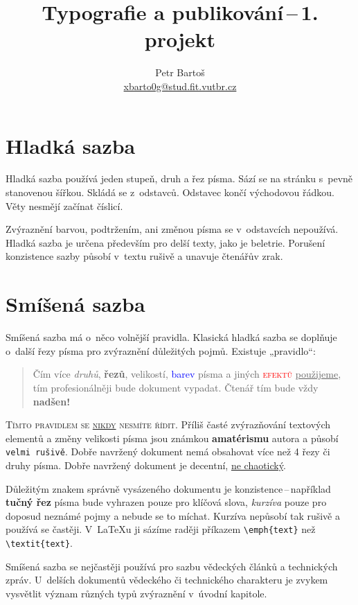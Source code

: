 \documentclass[twocolumn, 10pt, a4paper]{article}
\title{Typografie a publikování\,--\,1. projekt}
\author{Petr Bartoš \\ \href{mailto:xbarto0g@stud.fit.vutbr.cz}{xbarto0g@stud.fit.vutbr.cz}}
\date{}
\begin{document}
\maketitle

\section{Hladká sazba}
Hladká sazba používá jeden stupeň, druh a řez písma.
Sází se na stránku s~pevně stanovenou šířkou.
Skládá se z~odstavců. Odstavec končí východovou řádkou.
Věty nesmějí začínat číslicí.

Zvýraznění barvou, podtržením, ani změnou písma se v~odstavcích nepoužívá.
Hladká sazba je určena především pro delší texty, jako je beletrie.
Porušení konzistence sazby působí v~textu rušivě a unavuje čtenářův zrak.

\section{Smíšená sazba}
\label{section:druha_sekce}
Smíšená sazba má o~něco volnější pravidla.
Klasická hladká sazba se doplňuje o~další řezy písma pro zvýraznění důležitých pojmů.
Existuje „pravidlo“:
\begin{quotation}
Čím více \emph{druhů}, \textbf{řezů}, {\huge velikostí}, \textcolor{blue}{barev} písma a jiných \textcolor{red}{\textsc{efektů}} \underline{použijeme}, tím \textcolor{BurntOrange}{profesionálněji} bude {\Large {}\selectfont dokument} vypadat.
{\tiny Čtenář} tím bude vždy {\Huge \textbf{nadšen!}}
\end{quotation}

\textsc{Tímto pravidlem se \underline{nikdy} nesmíte řídit.}
Příliš časté zvýrazňování textových elementů a změny {\tiny velikosti} písma jsou známkou \textbf{amatérismu} autora a působí \texttt{velmi rušivě}.
Dobře navržený dokument nemá obsahovat více než 4 řezy či druhy písma.
Dobře navržený dokument je decentní, \underline{ne chaotický}.

Důležitým znakem správně vysázeného dokumentu je konzistence\,--\,například \textbf{tučný řez} písma bude vyhrazen pouze pro klíčová slova, \emph{kurzíva} pouze pro doposud neznámé pojmy a nebude se to míchat.
Kurzíva nepůsobí tak rušivě a používá se častěji.
V~\LaTeX u ji sázíme raději příkazem \verb|\emph{text}| než \verb|\textit{text}|.

Smíšená sazba se nejčastěji používá pro sazbu vědeckých článků a technických zpráv.
U~delších dokumentů vědeckého či technického charakteru je zvykem vysvětlit význam různých typů zvýraznění v~úvodní kapitole.
\end{document}
